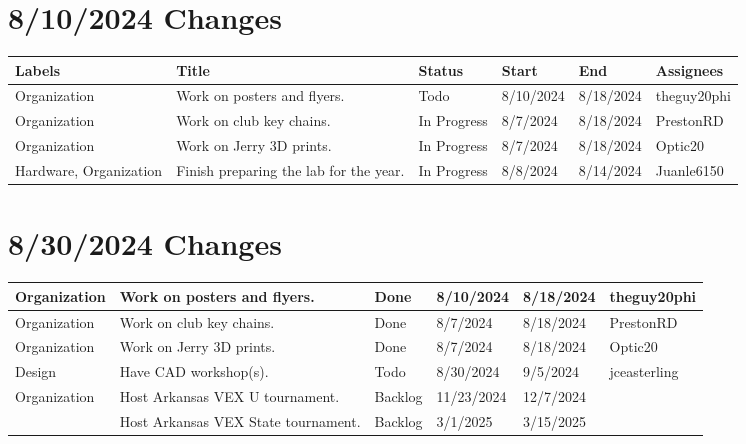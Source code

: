 

\section{8/10/2024 Changes}
\begin{center}
\begin{longtable}{| p{40pt} | p{150pt} | p{35pt} | p{33pt} | p{33pt} | p{40pt} |}
\hline \rowcolor{white}
\textbf{\scriptsize{Labels}} & \textbf{\scriptsize{Title}} & \textbf{\scriptsize{Status}} & \textbf{\scriptsize{Start}} & \textbf{\scriptsize{End}} & \textbf{\scriptsize{Assignees}} \\
\hline \rowcolor{IndianRed1}
Organization & Work on posters and flyers. & Todo & 8/10/2024 & 8/18/2024 & theguy20phi \\
\hline \rowcolor{LightGoldenrod1}
Organization & Work on club key chains. & In Progress & 8/7/2024 & 8/18/2024 & PrestonRD \\
\hline \rowcolor{LightGoldenrod1}
Organization & Work on Jerry 3D prints. & In Progress & 8/7/2024 & 8/18/2024 & Optic20 \\
\hline \rowcolor{LightGoldenrod1}
Hardware, Organization & Finish preparing the lab for the year. & In Progress & 8/8/2024 & 8/14/2024 & Juanle6150 \\
\hline
\end{longtable}
\end{center}


\section{8/30/2024 Changes}
\begin{center}
\begin{longtable}{| p{40pt} | p{150pt} | p{35pt} | p{33pt} | p{33pt} | p{40pt} |}
\hline \rowcolor{DarkSeaGreen1}
Organization & Work on posters and flyers. & Done & 8/10/2024 & 8/18/2024 & theguy20phi \\
\hline \rowcolor{DarkSeaGreen1}
Organization & Work on club key chains. & Done & 8/7/2024 & 8/18/2024 & PrestonRD \\
\hline \rowcolor{DarkSeaGreen1}
Organization & Work on Jerry 3D prints. & Done & 8/7/2024 & 8/18/2024 & Optic20 \\
\hline \rowcolor{IndianRed1}
Design & Have CAD workshop(s). & Todo & 8/30/2024 & 9/5/2024 & jceasterling \\
\hline \rowcolor{Ivory2}
Organization & Host Arkansas VEX U tournament. & Backlog & 11/23/2024 & 12/7/2024 & \\
\hline \rowcolor{Ivory2}
& Host Arkansas VEX State tournament. & Backlog & 3/1/2025 & 3/15/2025 & \\
\hline
\end{longtable}
\end{center}



